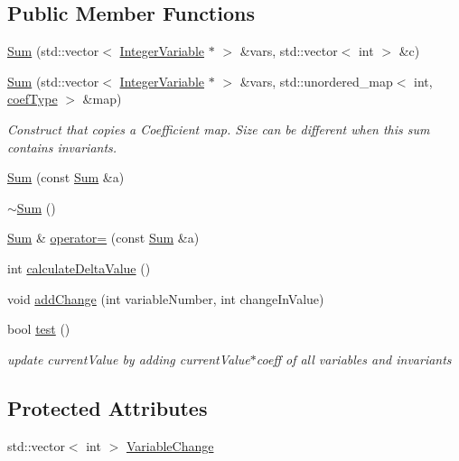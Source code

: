 \subsection*{Public Member Functions}
\begin{DoxyCompactItemize}
\item 
\hyperlink{class_sum_a040422e1db02842bf2c81575d90cceec}{Sum} (std\-::vector$<$ \hyperlink{class_integer_variable}{Integer\-Variable} $\ast$ $>$ \&vars, std\-::vector$<$ int $>$ \&c)
\item 
\hyperlink{class_sum_a48e47cd10ccf9c06deb6f675f325e1f4}{Sum} (std\-::vector$<$ \hyperlink{class_integer_variable}{Integer\-Variable} $\ast$ $>$ \&vars, std\-::unordered\-\_\-map$<$ int, \hyperlink{_constants_8hpp_a08c47c54ab9fb1545c341ec853cc2278}{coef\-Type} $>$ \&map)
\begin{DoxyCompactList}\small\item\em Construct that copies a Coefficient map. Size can be different when this sum contains invariants. \end{DoxyCompactList}\item 
\hyperlink{class_sum_a3460bcef17644813aa7200d8dd6b1750}{Sum} (const \hyperlink{class_sum}{Sum} \&a)
\item 
\hyperlink{class_sum_a9481fc530cb81210b25ecb2530d25773}{$\sim$\-Sum} ()
\item 
\hyperlink{class_sum}{Sum} \& \hyperlink{class_sum_a6a0a9edc7fc997187cec32eba22f087e}{operator=} (const \hyperlink{class_sum}{Sum} \&a)
\item 
int \hyperlink{class_sum_a6b0ada7dc577609e3140a8695155f280}{calculate\-Delta\-Value} ()
\item 
void \hyperlink{class_sum_aa66687e018c67ebedcabd69750374e2d}{add\-Change} (int variable\-Number, int change\-In\-Value)
\item 
bool \hyperlink{class_sum_a1adcbbefeb5f25445563fada563d4fa1}{test} ()
\begin{DoxyCompactList}\small\item\em update current\-Value by adding current\-Value$\ast$coeff of all variables and invariants \end{DoxyCompactList}\end{DoxyCompactItemize}
\subsection*{Protected Attributes}
\begin{DoxyCompactItemize}
\item 
std\-::vector$<$ int $>$ \hyperlink{class_sum_a10e9f89fdcf0f674e0280629144b3f92}{Variable\-Change}
\end{DoxyCompactItemize}


